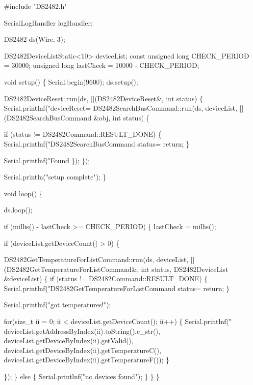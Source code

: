 \begin{DoxyCode}
#include "DS2482.h"

SerialLogHandler logHandler;

DS2482 ds(Wire, 3);

DS2482DeviceListStatic<10> deviceList;
const unsigned long CHECK\_PERIOD = 30000;
unsigned long lastCheck = 10000 - CHECK\_PERIOD;

void setup() \{
    Serial.begin(9600);
    ds.setup();

    DS2482DeviceReset::run(ds, [](DS2482DeviceReset&, int status) \{
        Serial.printlnf("deviceReset=%
        DS2482SearchBusCommand::run(ds, deviceList, [](DS2482SearchBusCommand &obj, int status) \{

            if (status != DS2482Command::RESULT\_DONE) \{
                Serial.printlnf("DS2482SearchBusCommand status=%
                return;
            \}

            Serial.printlnf("Found %
        \});
    \});

    Serial.println("setup complete");
\}


void loop() \{

    ds.loop();

    if (millis() - lastCheck >= CHECK\_PERIOD) \{
        lastCheck = millis();

        if (deviceList.getDeviceCount() > 0) \{

            DS2482GetTemperatureForListCommand::run(ds, deviceList, [](DS2482GetTemperatureForListCommand&,
       int status, DS2482DeviceList &deviceList) \{
                if (status != DS2482Command::RESULT\_DONE) \{
                    Serial.printlnf("DS2482GetTemperatureForListCommand status=%
                    return;
                \}

                Serial.printlnf("got temperatures!");

                for(size\_t ii = 0; ii < deviceList.getDeviceCount(); ii++) \{
                    Serial.printlnf("%
                            deviceList.getAddressByIndex(ii).toString().c\_str(),
                            deviceList.getDeviceByIndex(ii).getValid(),
                            deviceList.getDeviceByIndex(ii).getTemperatureC(),
                            deviceList.getDeviceByIndex(ii).getTemperatureF());
                \}

            \});
        \}
        else \{
            Serial.printlnf("no devices found");
        \}
    \}
\}
\end{DoxyCode}


